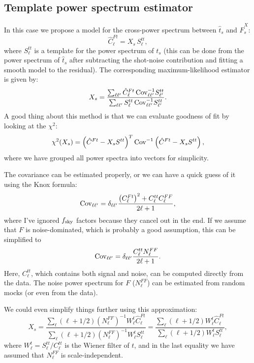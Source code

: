 \documentclass{article}
\begin{document}
  \subsection{Template power spectrum estimator}
    In this case we propose a model for the cross-power spectrum between $\hat{t}_s$ and $\hat{F}^{X}_s$:
    \begin{equation}
      \hat{C}^{Ft}_\ell=X_s\,S^{tt}_\ell,
    \end{equation}
    where $S^{tt}_\ell$ is a template for the power spectrum of $t_s$ (this can be done from the power spectrum of $\hat{t}_s$ after subtracting the shot-noise contribution and fitting a smooth model to the residual).
    The corresponding maximum-likelihood estimator is given by:
    \begin{equation}
      X_s=\frac{\sum_{\ell\ell'}\hat{C}^{Ft}_\ell\,{\rm Cov}^{-1}_{\ell\ell'}S^{tt}_{\ell'}}{\sum_{\ell\ell'}S^{tt}_\ell\,{\rm Cov}^{-1}_{\ell\ell'}S^{tt}_{\ell'}}.
    \end{equation}
    A good thing about this method is that we can evaluate goodness of fit by looking at the $\chi^2$:
    \begin{equation}
      \chi^2(X_s)=\left(\hat{C}^{Ft}-X_sS^{tt}\right)^T{\rm Cov}^{-1}\left(\hat{C}^{Ft}-X_sS^{tt}\right),
    \end{equation}
    where we have grouped all power spectra into vectors for simplicity.   
   
    The covariance can be estimated properly, or we can have a quick guess of it using the Knox formula:
    \begin{equation}
      {\rm Cov}_{\ell\ell'}=\delta_{\ell\ell'}\frac{\left(C^{Ft}_\ell\right)^2+C^{tt}_\ell C^{FF}_\ell}{2\ell+1},
    \end{equation}
    where I've ignored $f_{\rm sky}$ factors because they cancel out in the end. If we assume that $F$ is noise-dominated, which is probably a good assumption, this can be simplified to
    \begin{equation}
      {\rm Cov}_{\ell\ell'}=\delta_{\ell\ell'}\frac{C^{tt}_\ell N^{FF}_\ell}{2\ell+1}.
    \end{equation}
    Here, $C^{tt}_\ell$, which contains both signal and noise, can be computed directly from the data. The noise power spectrum for $F$ ($N^{FF}_\ell$) can be estimated from random mocks (or even from the data).
    
    We could even simplify things further using this approximation:
    \begin{equation}
      X_s=\frac{\sum_\ell (\ell+1/2) (N^{FF}_\ell)^{-1}W^t_\ell\hat{C}^{Ft}_\ell}{\sum_\ell(\ell+1/2) (N^{FF}_\ell)^{-1}W^t_\ell S^{tt}_\ell}=\frac{\sum_\ell (\ell+1/2) W^t_\ell\hat{C}^{Ft}_\ell}{\sum_\ell(\ell+1/2) W^t_\ell S^{tt}_\ell},
    \end{equation}
    where $W^t_\ell=S^{tt}_\ell/C^{tt}_\ell$ is the Wiener filter of $t$, and in the last equality we have assumed that $N^{FF}_\ell$ is scale-independent.
\end{document}
